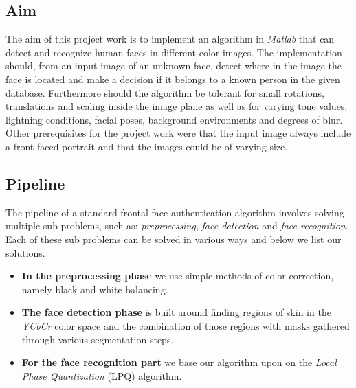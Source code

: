 \subsection{Aim}
The aim of this project work is to implement an algorithm in \textit{Matlab} that can detect and recognize human faces in different color images. The implementation should, from an input image of an unknown face, detect where in the image the face is located and make a decision if it belongs to a known person in the given database. Furthermore should the algorithm be tolerant for small rotations, translations and scaling inside the image plane as well as for varying tone values, lightning conditions, facial poses, background environments and degrees of blur. Other prerequisites for the project work were that the input image always include a front-faced portrait and that the images could be of varying size.


\subsection{Pipeline}
The pipeline of a standard frontal face authentication algorithm involves solving multiple sub problems, such as: \textit{preprocessing}, \textit{face detection} and \textit{face recognition}. Each of these sub problems can be solved in various ways and below we list our solutions.

\begin{itemize}
  \item \textbf{In the preprocessing phase} we use simple methods of color correction, namely black and white balancing. 
  \item \textbf{The face detection phase} is built around finding regions of skin in the \textit{YCbCr} color space and the combination of those regions with masks gathered through various segmentation steps. 
  \item \textbf{For the face recognition part} we base our algorithm upon on the \textit{Local Phase Quantization} (LPQ) algorithm. 

\end{itemize}
